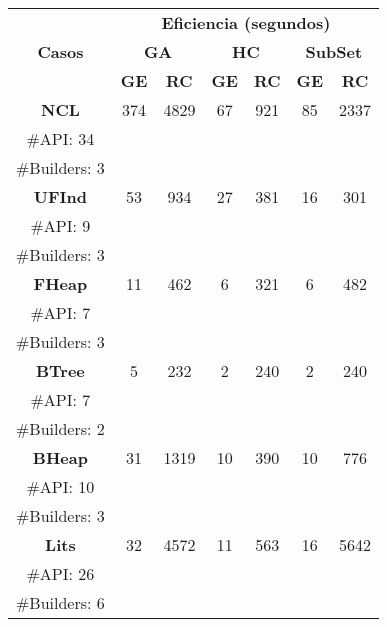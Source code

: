 \begin{table}[H]
\centering
\label{tab:t1}
\scriptsize
\begin{tabular}{cccccccc}
\midrule
\multicolumn{2}{c}{\multirow{3}{*}{\textbf{Casos}}} & \multicolumn{6}{c}{\textbf{Eficiencia (segundos)}} \\
\cline{3-8}
\multicolumn{2}{c}{} & \multicolumn{2}{c}{\textbf{GA}} & \multicolumn{2}{c}{\textbf{HC}} & \multicolumn{2}{c}{\textbf{SubSet}} \\
\multicolumn{2}{c}{} & \textbf{\tiny{GE}} & \textbf{\tiny{RC}} & \textbf{\tiny{GE}} & \textbf{\tiny{RC}} & \textbf{\tiny{GE}} & \textbf{\tiny{RC}} \\
\midrule
\multicolumn{2}{c}{\textbf{NCL}} & 374  & 4829  & 67  &921   &  85 &  2337   \\
\multicolumn{2}{c}{\tiny \#API: 34} &  &   & &   & & \\
\multicolumn{2}{c}{\tiny \#Builders: 3} &  &   & &   & & \\
\midrule
\multicolumn{2}{c}{\textbf{UFInd}} & 53  & 934  & 27  &381   &  16 &  301   \\
\multicolumn{2}{c}{\tiny \#API: 9} &  &   & &   & & \\
\multicolumn{2}{c}{\tiny \#Builders: 3} &  &   & &   & & \\
\midrule
\multicolumn{2}{c}{\textbf{FHeap}} & 11  & 462  & 6  &321   &  6 &  482   \\
\multicolumn{2}{c}{\tiny \#API: 7} &  &   & &   & & \\
\multicolumn{2}{c}{\tiny \#Builders: 3} &  &   & &   & & \\
\midrule
\multicolumn{2}{c}{\textbf{BTree}} &  5 &  232 & 2  & 240   &  2 & 240   \\
\multicolumn{2}{c}{\tiny \#API: 7} &  &   & &   & & \\
\multicolumn{2}{c}{\tiny \#Builders: 2} &  &   & &   & & \\
\midrule
\multicolumn{2}{c}{\textbf{BHeap}} & 31 &  1319 & 10 & 390  & 10 &  776   \\
\multicolumn{2}{c}{\tiny \#API: 10} &  &   & &   & & \\
\multicolumn{2}{c}{\tiny \#Builders: 3} &  &   & &   & & \\
\midrule
\multicolumn{2}{c}{\textbf{Lits}} & 32  & 4572  & 11  &  563 & 16  & 5642   \\
\multicolumn{2}{c}{\tiny \#API: 26} &  &   & &   & & \\
\multicolumn{2}{c}{\tiny \#Builders: 6} &  &   & &   & & \\

\end{tabular}
\end{table}
